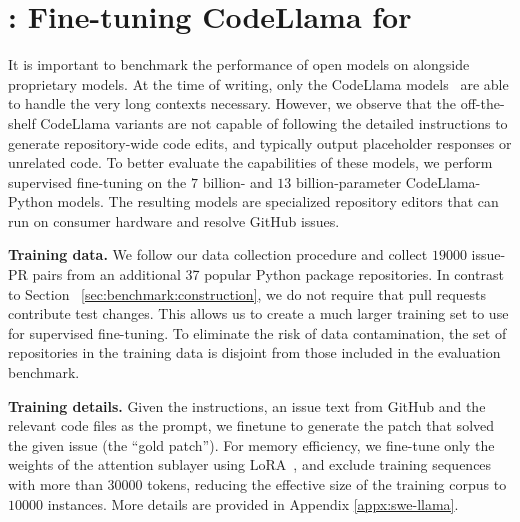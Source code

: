 \section{\swellama{}: Fine-tuning CodeLlama for \benchmark{}}
\label{sec:swellama-fine-tuning-codellama-for-benchmark}

It is important to benchmark the performance of open models on \benchmark{} alongside proprietary models.
At the time of writing, only the CodeLlama models~\citep{rozière2023code} are able to handle the very long contexts necessary.
However, we observe that the off-the-shelf CodeLlama variants are not capable of following the detailed instructions to generate repository-wide code edits, and typically output placeholder responses or unrelated code. To better evaluate the capabilities of these models, we perform supervised fine-tuning on the $7$ billion- and $13$ billion-parameter CodeLlama-Python models. The resulting models are specialized repository editors that can run on consumer hardware and resolve GitHub issues.

\textbf{Training data.} We follow our data collection procedure and collect $\num{19000}$ issue-PR pairs from an additional 37 popular Python package repositories. In contrast to Section~ \ref{sec:benchmark:construction}, we do not require that pull requests contribute test changes.
This allows us to create a much larger training set to use for supervised fine-tuning.
To eliminate the risk of data contamination, the set of repositories in the training data is disjoint from those included in the evaluation benchmark.

\textbf{Training details.}  
Given the instructions, an issue text from GitHub and the relevant code files as the prompt, we finetune \swellama{} to generate the patch that solved the given issue (the ``gold patch'').
For memory efficiency, we fine-tune only the weights of the attention sublayer using LoRA~\cite{hu2022lora}, and exclude training sequences with more than $\num{30000}$ tokens, reducing the effective size of the training corpus to $\num{10000}$ instances. More details are provided in Appendix \ref{appx:swe-llama}.